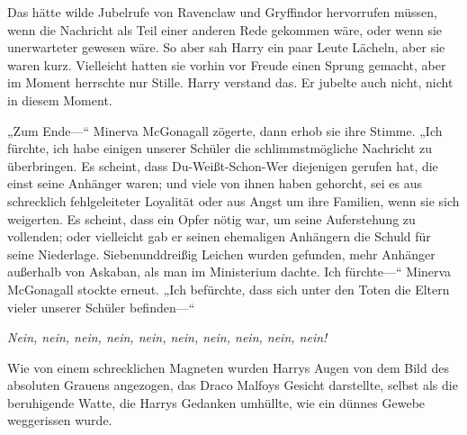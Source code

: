 Das hätte wilde Jubelrufe von Ravenclaw und Gryffindor hervorrufen müssen, wenn die Nachricht als Teil einer anderen Rede gekommen wäre, oder wenn sie unerwarteter gewesen wäre. So aber sah Harry ein paar Leute Lächeln, aber sie waren kurz. Vielleicht hatten sie vorhin vor Freude einen Sprung gemacht, aber im Moment herrschte nur Stille. Harry verstand das. Er jubelte auch nicht, nicht in diesem Moment.

„Zum Ende—“ Minerva McGonagall zögerte, dann erhob sie ihre Stimme. „Ich fürchte, ich habe einigen unserer Schüler die schlimmstmögliche Nachricht zu überbringen. Es scheint, dass Du-Weißt-Schon-Wer diejenigen gerufen hat, die einst seine Anhänger waren; und viele von ihnen haben gehorcht, sei es aus schrecklich fehlgeleiteter Loyalität oder aus Angst um ihre Familien, wenn sie sich weigerten. Es scheint, dass ein Opfer nötig war, um seine Auferstehung zu vollenden; oder vielleicht gab er seinen ehemaligen Anhängern die Schuld für seine Niederlage. Siebenunddreißig Leichen wurden gefunden, mehr Anhänger außerhalb von Askaban, als man im Ministerium dachte. Ich fürchte—“
Minerva McGonagall stockte erneut.
„Ich befürchte, dass sich unter den Toten die Eltern vieler unserer Schüler befinden—“

\emph{Nein, nein, nein, nein, nein, nein, nein, nein, nein, nein!}

Wie von einem schrecklichen Magneten wurden Harrys Augen von dem Bild des absoluten Grauens angezogen, das Draco Malfoys Gesicht darstellte, selbst als die beruhigende Watte, die Harrys Gedanken umhüllte, wie ein dünnes Gewebe weggerissen wurde.

